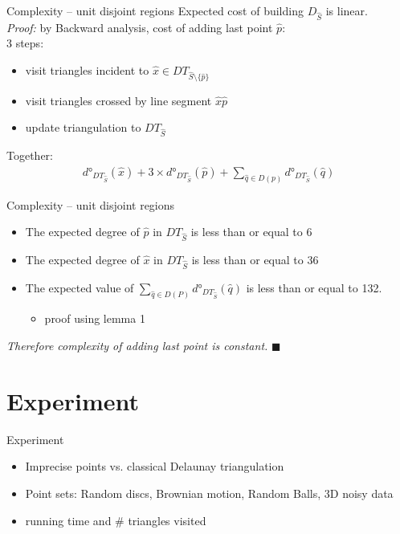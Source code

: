 \documentclass{beamer}
\begin{document}
\begin{frame}{Complexity -- unit disjoint regions}
Expected cost of building $D_{\hat{S}}$ is linear.
\\
\textit{Proof:} by Backward analysis, cost of adding last point $\hat{p}$:\\
3 steps:
\begin{itemize}
\item visit triangles incident to $\hat{x} \in DT_{\hat{S} \setminus \{\hat{p}\}}$
\item visit triangles crossed by line segment $\hat{x}\hat{p}$
\item update triangulation to $DT_{\hat{S}}$
\end{itemize}

Together: 
\begin{gather*}
d°_{DT_{\hat{S}}}(\hat{x}) + 3 \times d°_{DT_{\hat{S}}}(\hat{p}) + \sum_{\hat{q} \in D(p)} d°_{DT_{\hat{S}}}(\hat{q})
\end{gather*}

\end{frame}

\begin{frame}{Complexity -- unit disjoint regions}

\begin{itemize}
\item The expected degree of $\hat{p}$ in $DT_{\hat{S}}$ is less than or equal to 6
\item The expected degree of $\hat{x}$ in $DT_{\hat{S}}$ is less than or equal to 36
\item The expected value of $\sum_{\hat{q}\in D(P)} d°_{DT_{\hat{S}}}(\hat{q})$ is less than or equal to 132.
\begin{itemize}
\item proof using lemma 1
\end{itemize}
\end{itemize}

\textit{Therefore complexity of adding last point is constant.} $\blacksquare$
\end{frame}

\section{Experiment}
\frame{\tableofcontents[currentsection]}
\begin{frame}{Experiment}
\begin{itemize}
\item Imprecise points vs. classical Delaunay triangulation
\item Point sets: Random discs, Brownian motion, Random Balls, 3D noisy data
\item running time and \# triangles visited
\end{itemize}
\end{frame}
\end{document}
